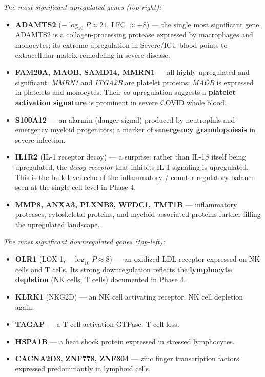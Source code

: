 \documentclass[11pt, a4paper]{article}
\begin{document}
\textit{The most significant upregulated genes (top-right):}
\begin{itemize}[nosep]
  \item \textbf{ADAMTS2} ($-\log_{10}P \approx 21$, LFC $\approx +8$) — the single
        most significant gene. ADAMTS2 is a collagen-processing protease expressed
        by macrophages and monocytes; its extreme upregulation in Severe/ICU blood
        points to extracellular matrix remodeling in severe disease.
  \item \textbf{FAM20A, MAOB, SAMD14, MMRN1} — all highly upregulated and significant.
        \textit{MMRN1} and \textit{ITGA2B} are platelet proteins; \textit{MAOB} is
        expressed in platelets and monocytes. Their co-upregulation suggests
        a \textbf{platelet activation signature} is prominent in severe COVID whole blood.
  \item \textbf{S100A12} — an alarmin (danger signal) produced by neutrophils and
        emergency myeloid progenitors; a marker of \textbf{emergency granulopoiesis}
        in severe infection.
  \item \textbf{IL1R2} (IL-1 receptor decoy) — a surprise: rather than IL-1$\beta$
        itself being upregulated, the \textit{decoy receptor} that inhibits IL-1 signaling
        is upregulated. This is the bulk-level echo of the inflammatory / counter-regulatory
        balance seen at the single-cell level in Phase 4.
  \item \textbf{MMP8, ANXA3, PLXNB3, WFDC1, TMT1B} — inflammatory proteases,
        cytoskeletal proteins, and myeloid-associated proteins further filling the
        upregulated landscape.
\end{itemize}

\textit{The most significant downregulated genes (top-left):}
\begin{itemize}[nosep]
  \item \textbf{OLR1} (LOX-1, $-\log_{10}P \approx 8$) — an oxidized LDL receptor
        expressed on NK cells and T cells. Its strong downregulation reflects the
        \textbf{lymphocyte depletion} (NK cells, T cells) documented in Phase 4.
  \item \textbf{KLRK1} (NKG2D) — an NK cell activating receptor. NK cell depletion
        again.
  \item \textbf{TAGAP} — a T cell activation GTPase. T cell loss.
  \item \textbf{HSPA1B} — a heat shock protein expressed in stressed lymphocytes.
  \item \textbf{CACNA2D3, ZNF778, ZNF304} — zinc finger transcription factors
        expressed predominantly in lymphoid cells.
\end{itemize}
\end{document}
